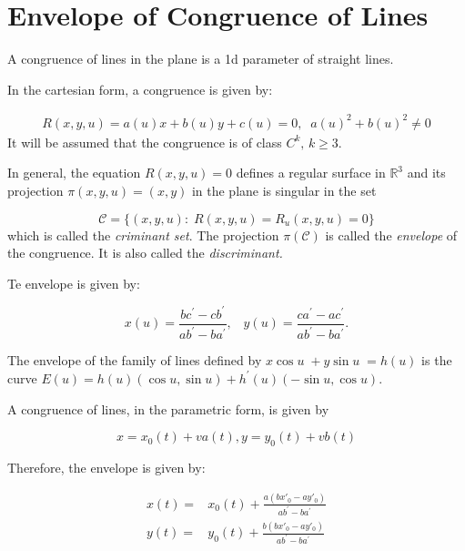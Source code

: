 
\section{Envelope of Congruence of Lines}
\label{app:B-envelope}

\begin{definition}
A congruence of lines in the plane is a 1d parameter of straight lines.
\end{definition}

 
   In the cartesian form, a congruence is given by:
 

\begin{align}  R(x,y,u)=a(u)x+b(u)y+c(u)=0,\;\; a(u)^2+b(u)^2\ne  0
\label{eq:appB-cr}
\end{align}
It will be assumed that the congruence is of class  $C^k,\, k\geq 3$. 

In general, the equation   $R(x,y,u)=0$ defines a regular surface in   $\mathbb{R}^3$  and its projection   $\pi(x,y,u)=(x,y)$ in the plane is singular in the set  

  \[\mathcal{C}= \{(x,y,u): \; R(x,y,u)=  R_u(x,y,u) =0 \} \]
  which is called the   \textit{criminant set}.
  The projection $\pi(\mathcal{C})$ is called the \textit{envelope} of the congruence. It is also called the     \textit{  discriminant.}

Te envelope is given by:

\begin{equation}\label{eq:env}
x(u)=\frac{b c^\prime-c b^\prime}{a b^\prime-b a^\prime},\;\;\; y(u)=\frac{c a^\prime-a c^\prime}{a b^\prime-b a^\prime}.
\end{equation}

 

\begin{example}  The envelope of the family of lines defined by   $x \cos u\;  +y\sin u \;  =h(u)$ is the curve
	$E(u)=h(u)(\cos u,\sin u)	+h^\prime(u)(-\sin u, \cos u). $
\end{example}

 
 A congruence of lines, in the parametric form, is given by
 
 \[ x=x_0(t)+v a(t), y=y_0(t)+v b(t)\]

 Therefore, the envelope is given by:
 
	
 	\begin{align*}
   x(t)=&x_0(t)+\frac{   a( b x'_0-a y'_0)}{a b^\prime-b a^\prime} \\
 	y(t)=&y_0(t)+ \frac{   b( b x'_0-a y'_0)}{a b^\prime-b a^\prime} 	\end{align*}
 
